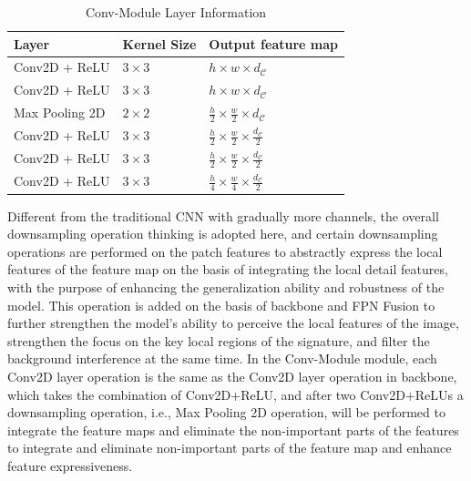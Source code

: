 \begin{table}[htbp]
\caption{Conv-Module Layer Information}  
\begin{center}
\begin{tabu} to 0.8\textwidth{X[3, c]X[3, c]X[3, c]}  
\toprule
Layer & Kernel Size & Output feature map\\
\midrule
Conv2D + ReLU & $3\times 3$ & $h\times w\times d_\mathcal{C}$ \\ 
Conv2D + ReLU & $3\times 3$ & $h\times w\times d_\mathcal{C}$ \\ 
Max Pooling 2D & $2\times 2$ & $\frac{h}{2}\times \frac{w}{2}\times d_\mathcal{C}$ \\ 
Conv2D + ReLU & $3\times 3$ & $\frac{h}{2}\times \frac{w}{2}\times \frac{d_\mathcal{C}}{2}$ \\ 
Conv2D + ReLU & $3\times 3$ & $\frac{h}{2}\times \frac{w}{2}\times \frac{d_\mathcal{C}}{2}$ \\ 
Conv2D + ReLU & $3\times 3$ & $\frac{h}{4}\times \frac{w}{4}\times \frac{d_\mathcal{C}}{2}$ \\ 
\bottomrule
\end{tabu}
\end{center}
\label{tab:conv}
\end{table}

Different from the traditional CNN with gradually more channels, the overall downsampling operation thinking is adopted here, and certain downsampling operations are performed on the patch features to abstractly express the local features of the feature map on the basis of integrating the local detail features, with the purpose of enhancing the generalization ability and robustness of the model. This operation is added on the basis of backbone and FPN Fusion to further strengthen the model's ability to perceive the local features of the image, strengthen the focus on the key local regions of the signature, and filter the background interference at the same time. In the Conv-Module module, each Conv2D layer operation is the same as the Conv2D layer operation in backbone, which takes the combination of Conv2D+ReLU, and after two Conv2D+ReLUs a downsampling operation, i.e., Max Pooling 2D operation, will be performed to integrate the feature maps and eliminate the non-important parts of the features to integrate and eliminate non-important parts of the feature map and enhance feature expressiveness.


